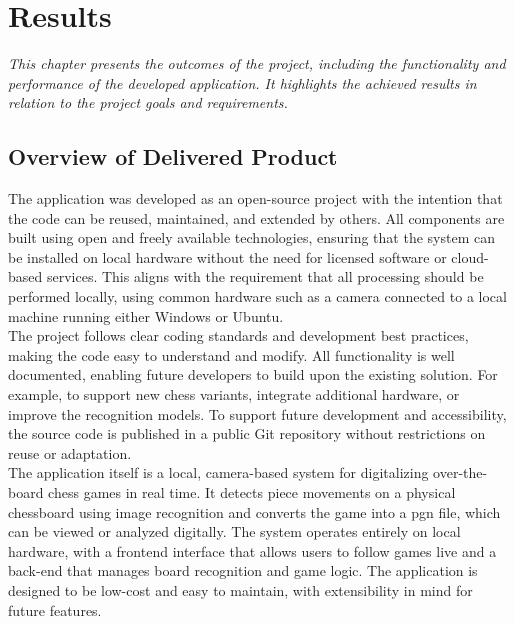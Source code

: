 \chapter{Results}

\begin{center}
    \textit{This chapter presents the outcomes of the project, including the functionality and performance of the developed application. It highlights the achieved results in relation to the project goals and requirements.}
\end{center}

\section{Overview of Delivered Product}
The application was developed as an open-source project with the intention that the code can be reused, maintained, and extended by others. All components are built using open and freely available technologies, ensuring that the system can be installed on local hardware without the need for licensed software or cloud-based services. This aligns with the requirement that all processing should be performed locally, using common hardware such as a camera connected to a local machine running either Windows or Ubuntu. \\

The project follows clear coding standards and development best practices, making the code easy to understand and modify. All functionality is well documented, enabling future developers to build upon the existing solution. For example, to support new chess variants, integrate additional hardware, or improve the recognition models. To support future development and accessibility, the source code is published in a public Git repository without restrictions on reuse or adaptation. \\

The application itself is a local, camera-based system for digitalizing over-the-board chess games in real time. It detects piece movements on a physical chessboard using image recognition and converts the game into a \gls{pgn} file, which can be viewed or analyzed digitally. The system operates entirely on local hardware, with a frontend interface that allows users to follow games live and a back-end that manages board recognition and game logic. The application is designed to be low-cost and easy to maintain, with extensibility in mind for future features. \\

